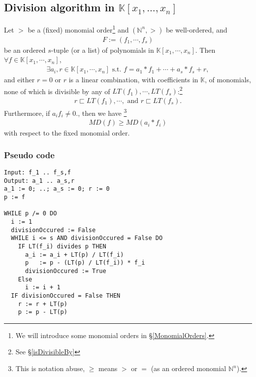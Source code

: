 \documentclass[11pt]{book}
\begin{document}
\subsection{Division algorithm in $\mathbb{K}[x_1, ... , x_n]$}
\label{DivisionAlgorithmInN}
Let $>$ be a (fixed) monomial order\footnote{We will introduce some monomial orders in \S\ref{MonomialOrders}.} and $(\mathbb{N}^n, >)$ be well-ordered, and
\begin{eqnarray}
F := (f_1, \cdots, f_s)
\end{eqnarray}
be an ordered $s$-tuple (or a list) of polynomials in $\mathbb{K}[x_1, \cdots, x_n]$.
Then $\forall f \in \mathbb{K}[x_1, \cdots, x_n]$,
\begin{eqnarray}
\exists a_i, r  \in \mathbb{K}[x_1, \cdots, x_n] \text{ s.t. } f = a_1*f_1 + \cdots + a_s * f_s + r,
\end{eqnarray}
and either $r=0$ or $r$ is a linear combination, with coefficients in $\mathbb{K}$, of monomials, none of which is divisible by any of $LT(f_1), \cdots, LT(f_s)$:\footnote{See \S\ref{isDivisibleBy}}
\begin{eqnarray}
\label{remainderHasSmallerMultiDegree}
r \sqsubset LT(f_1), \cdots, \text{ and } r \sqsubset LT(f_s).
\end{eqnarray}
Furthermore, if $a_i f_i \neq 0$., then we have \footnote{This is notation abuse, $\geq$ means $>$ or $=$ (as an ordered monomial $\mathbb{N}^n$).}
\begin{eqnarray}
\label{decreasingMultiDegree}
MD(f) \geq MD(a_i * f_i)
\end{eqnarray}
with respect to the fixed monomial order.

\newpage
\subsubsection{Pseudo code}
\begin{verbatim}
Input: f_1 .. f_s,f
Output: a_1 .. a_s,r
a_1 := 0; ..; a_s := 0; r := 0
p := f

WHILE p /= 0 DO
  i := 1
  divisionOccured := False
  WHILE i <= s AND divisionOccured = False DO
    IF LT(f_i) divides p THEN
      a_i := a_i + LT(p) / LT(f_i)
      p   := p - (LT(p) / LT(f_i)) * f_i
      divisionOccured := True
    Else
      i := i + 1
  IF divisionOccured = False THEN
    r := r + LT(p)
    p := p - LT(p)
\end{verbatim}
\end{document}
